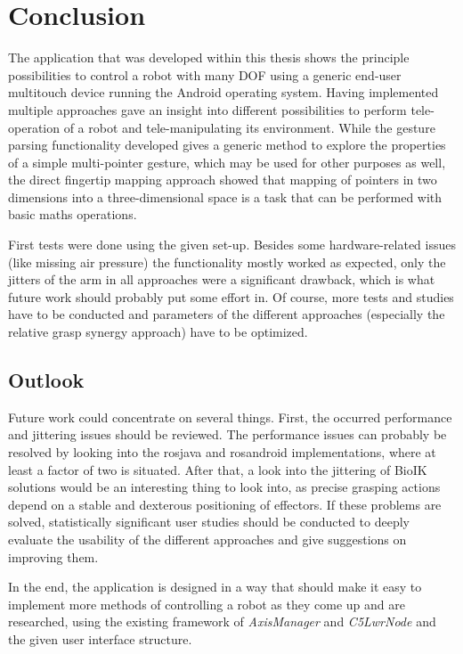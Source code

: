 \chapter{Conclusion}
\label{chap:concl}

The application that was developed within this thesis shows the principle possibilities to control a robot with many DOF using a generic end-user multitouch device running the Android operating system. Having implemented multiple approaches gave an insight into different possibilities to perform tele-operation of a robot and  tele-manipulating its environment. While the gesture parsing functionality developed gives a generic method to explore the properties of a simple multi-pointer gesture, which may be used for other purposes as well, the direct fingertip mapping approach showed that mapping of pointers in two dimensions into a three-dimensional space is a task that can be performed with basic maths operations.

First tests were done using the given set-up. Besides some hardware-related issues (like missing air pressure) the functionality mostly worked as expected, only the jitters of the arm in all approaches were a significant drawback, which is what future work should probably put some effort in. Of course, more tests and studies have to be conducted and parameters of the different approaches (especially the relative grasp synergy approach) have to be optimized.

\section{Outlook}

Future work could concentrate on several things. First, the occurred performance and jittering issues should be reviewed. The performance issues can probably be resolved by looking into the rosjava and rosandroid implementations, where at least a factor of two is situated. After that, a look into the jittering of BioIK solutions would be an interesting thing to look into, as precise grasping actions depend on a stable and dexterous positioning of effectors. If these problems are solved, statistically significant user studies should be conducted to deeply evaluate the usability of the different approaches and give suggestions on improving them.

In the end, the application is designed in a way that should make it easy to implement more methods of controlling a robot as they come up and are researched, using the existing framework of \textit{AxisManager} and \textit{C5LwrNode} and the given user interface structure.